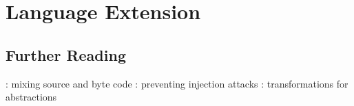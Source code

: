 \chapter{Language Extension}

\section{Further Reading}

\cite{KatsBV08}: mixing source and byte code
\cite{BravenboerV07}
\cite{BravenboerDV10}: preventing injection attacks
\cite{Visser-SCAM-2005}: transformations for abstractions

